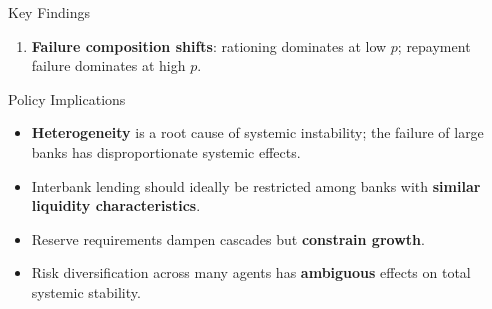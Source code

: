 \begin{frame}{Key Findings}
  \begin{enumerate}
    \item \textbf{Failure composition shifts}: rationing dominates at low $p$; repayment failure dominates at high $p$.
  \end{enumerate}
\end{frame}

\begin{frame}{Policy Implications}
  \begin{itemize}
    \item \textbf{Heterogeneity} is a root cause of systemic instability; the failure of large banks has disproportionate systemic effects.
    \item Interbank lending should ideally be restricted among banks with \textbf{similar liquidity characteristics}.
    \item Reserve requirements dampen cascades but \textbf{constrain growth}.
    \item Risk diversification across many agents has \textbf{ambiguous} effects on total systemic stability.
  \end{itemize}
\end{frame}


